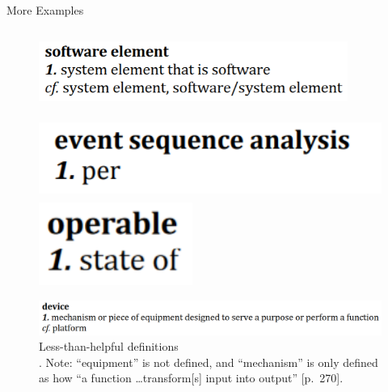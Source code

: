 \documentclass[22pt]{beamer}
\begin{document}
\begin{frame}[fragile]
\begin{textblock}{7.25}
\begin{block}{\fontsize{37}{20}\selectfont More Examples}
\begin{columns}
                \begin{column}{0.525\textwidth}
                    \begin{center}
                        \begin{figure}
                            \vspace{12mm}
                            \includegraphics[width=0.9\textwidth]{software element.png}

                            \vspace{2mm}

                            \includegraphics[height=2.7cm]{per.png}
                            \includegraphics[height=2.7cm]{state of.png}

                            \vspace{2mm}

                            \includegraphics[width=\textwidth]{device.png}

                            \vspace{2mm}

                            \caption{Less-than-helpful definitions\\
                            \cite[pp.~421, 170, 136, 301 (counterclockwise from top)]{IEEE2017}.
                            Note: ``equipment'' is not defined, and
                            ``mechanism'' is only defined as how ``a function
                            \dots transform[s] input into output'' [p.~270].}
                            \label{Fig:unhelpful-defs}
                        \end{figure}
                    \end{center}
                \end{column}
            \end{columns}


\end{block}
\end{textblock}
\end{frame}
\end{document}
